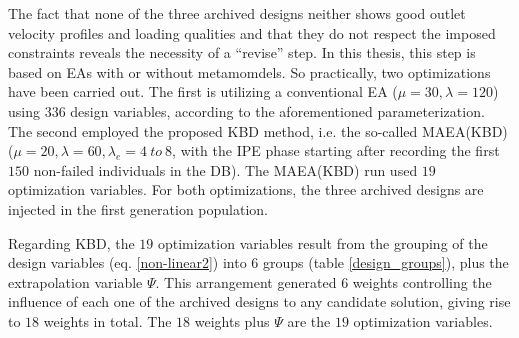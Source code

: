 The fact that none of the three archived designs neither shows good outlet velocity profiles and loading qualities and that they do not respect the imposed constraints reveals the necessity of a ``revise'' step. In this thesis, this step is based on EAs with or without metamomdels. So practically, two optimizations have been carried out. The first is utilizing a conventional EA ($\mu=30,\lambda=120$) using $336$ design variables, according to the aforementioned parameterization. The second employed the proposed KBD method, i.e. the so-called MAEA(KBD) ($\mu=20,\lambda=60,\lambda_e= 4 ~ to~ 8$, with the IPE phase starting after recording the first $150$ non-failed individuals in the DB). The MAEA(KBD) run used $19$ optimization variables. For both optimizations, the three archived designs are injected in the first generation population.

Regarding KBD, the $19$ optimization variables result from the grouping of the design variables (eq. \ref{non-linear2}) into $6$ groups (table \ref{design_groups}), plus the extrapolation variable $\Psi$. This arrangement generated $6$ weights controlling the influence of each one of the archived designs to any candidate solution, giving rise to $18$ weights in total. The $18$ weights plus $\Psi$ are the $19$ optimization variables.         



